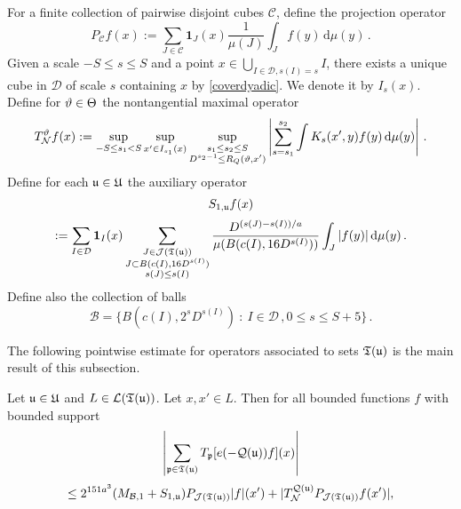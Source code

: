 For a finite collection of pairwise disjoint cubes $\mathcal{C}$, define the projection operator
$$
    P_{\mathcal{C}}f(x) :=\sum_{J\in\mathcal{C}}\mathbf{1}_J(x) \frac{1}{\mu(J)}\int_J f(y) \, \mathrm{d}\mu(y)\,.
$$
Given a scale $-S \le s\le S$ and a point $x \in \bigcup_{I\in \mathcal{D}, s(I) = s} I$, there exists a unique cube in $\mathcal{D}$ of scale $s$ containing $x$ by \eqref{coverdyadic}. We denote it by $I_s(x)$. Define for ${\vartheta} \in {\Theta}$ the nontangential maximal operator
\begin{equation}
    \label{eq-TN-def}
    T_{\mathcal{N}}^{\vartheta} f(x) := \sup_{-S \le s_1 < S} \sup_{x' \in I_{s_1}(x)} \sup_{\substack{s_1 \le s_2 \le S\\ D^{s_2-1} \le R_Q({\vartheta}, x')}} \left| \sum_{s = s_1}^{s_2} \int K_s(x',y) f(y) \, \mathrm{d}\mu(y) \right|\,.
\end{equation}
Define for each ${\mathfrak u} \in {\mathfrak U}$ the auxiliary operator
$$
    S_{1,{\mathfrak u}}f(x)
$$
\begin{equation}
    \label{eq-def-S-op}
    :=\sum_{I\in\mathcal{D}} \mathbf{1}_{I}(x) \sum_{\substack{J\in \mathcal{J}({\mathfrak T}({\mathfrak u}))\\
    J\subset B(c(I), 16 D^{s(I)})\\ s(J) \le s(I)}} \frac{D^{(s(J) - s(I))/a}}{\mu(B(c(I), 16D^{s(I)}))}\int_J |f(y)| \, \mathrm{d}\mu(y)\,.
\end{equation}
Define also the collection of balls
$$
    \mathcal{B} = \{B(c(I), 2^s D^{s(I)}) \ : \ I \in \mathcal{D}\,, 0 \le s \le S + 5\}\,.
$$

The following pointwise estimate for operators associated to sets ${\mathfrak T}({\mathfrak u})$ is the main result of this subsection.

\begin{lemma}
    \label{pointwise-tree-estimate}
    \leanok
    Let ${\mathfrak u} \in {\mathfrak U}$ and $L \in \mathcal{L}({\mathfrak T}({\mathfrak u}))$. Let $x, x' \in L$.
    Then for all bounded functions $f$ with bounded support
    $$
        \left|\sum_{{\mathfrak p} \in {\mathfrak T}({\mathfrak u})} T_{{\mathfrak p}}[ e(-{\mathcal{Q}}({\mathfrak u}))f](x)\right|
    $$
    \begin{equation}
        \label{eq-LJ-ptwise}
        \leq 2^{151a^3}(M_{\mathcal{B},1}+S_{1,{\mathfrak u}})P_{\mathcal{J}({\mathfrak T}({\mathfrak u}))}|f|(x')+|T_{\mathcal{N}}^{{\mathcal{Q}}({\mathfrak u})} P_{\mathcal{J}({\mathfrak T}({\mathfrak u}))}f(x')|,
    \end{equation}
\end{lemma}


